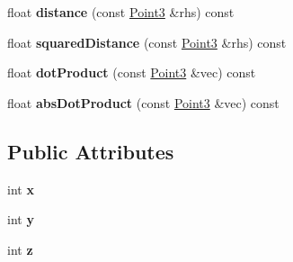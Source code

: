 \begin{DoxyCompactItemize}
\item 
\hypertarget{classPoint3_a63af1ec8b6adfb494a84a3b4627a0d63}{
float {\bfseries distance} (const \hyperlink{classPoint3}{\-Point3} \&rhs) const }
\label{d4/d36/classPoint3_a63af1ec8b6adfb494a84a3b4627a0d63}

\item 
\hypertarget{classPoint3_aeeb1a4304331ecf95f67d7ba5320374c}{
float {\bfseries squared\-Distance} (const \hyperlink{classPoint3}{\-Point3} \&rhs) const }
\label{d4/d36/classPoint3_aeeb1a4304331ecf95f67d7ba5320374c}

\item 
\hypertarget{classPoint3_ad1972dc3551a47438cc605108cfc31b8}{
float {\bfseries dot\-Product} (const \hyperlink{classPoint3}{\-Point3} \&vec) const }
\label{d4/d36/classPoint3_ad1972dc3551a47438cc605108cfc31b8}

\item 
\hypertarget{classPoint3_aa28875b8a7ca481fae93f912a3a474f8}{
float {\bfseries abs\-Dot\-Product} (const \hyperlink{classPoint3}{\-Point3} \&vec) const }
\label{d4/d36/classPoint3_aa28875b8a7ca481fae93f912a3a474f8}

\end{DoxyCompactItemize}
\subsection*{\-Public \-Attributes}
\begin{DoxyCompactItemize}
\item 
\hypertarget{classPoint3_a92f702275b1efaf2f94dd1ec4906eddc}{
int {\bfseries x}}
\label{d4/d36/classPoint3_a92f702275b1efaf2f94dd1ec4906eddc}

\item 
\hypertarget{classPoint3_ab6971f71fa10eb79349cd2fdb88ec3f2}{
int {\bfseries y}}
\label{d4/d36/classPoint3_ab6971f71fa10eb79349cd2fdb88ec3f2}

\item 
\hypertarget{classPoint3_aa5a05f33985d8f196214d99653847e06}{
int {\bfseries z}}
\label{d4/d36/classPoint3_aa5a05f33985d8f196214d99653847e06}

\end{DoxyCompactItemize}
